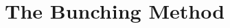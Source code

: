 \documentclass[inequalities.tex]{subfile}
\begin{document}
	\section{The Bunching Method}\label{sec:bunching}
\end{document}
